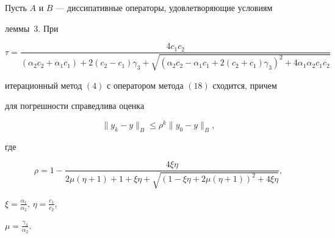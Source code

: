  


\begin{thm} 


Пусть $A$ и $B$ --- диссипативные операторы, удовлетворяющие условиям 


леммы~$3$. При 


\begin{equation} 


\tau=\frac{4c_1c_2} 


{(\alpha_2c_2+\alpha_1c_1) +2(c_2-c_1)\gamma_3+ 


\sqrt{(\alpha_2c_2-\alpha_1c_1+2(c_2+c_1)\gamma_3)^2+ 


4\alpha_1\alpha_2c_1c_2}} 


\end{equation} 


итерационный метод $(4)$ с оператором метода $(18)$ сходится, причем 


для погрешности справедлива оценка 


\begin{equation} 


\|y_k-y\|_B\le\rho^k\|y_0-y\|_B, 


\end{equation} 


где 


\begin{equation} 


\rho=1-\frac{4\xi\eta} 


{2\mu(\eta+1)+1+\xi\eta+ 


\sqrt{(1-\xi\eta+2\mu(\eta+1))^2+4\xi\eta}}, 


\end{equation} 


$\xi=\frac{\alpha_1}{\alpha_2}$, $\eta=\frac{c_1}{c_2}$, 


$\mu=\frac{\gamma_3}{\alpha_2}$. 


\end{thm} 


 


